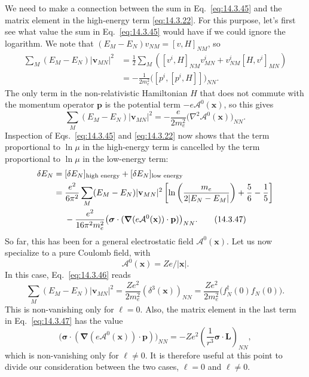 We need to make a connection between the sum in Eq.~\eqref{eq:14.3.45} and
the matrix element in the high-energy term \eqref{eq:14.3.22}. For this
purpose, let's first see what value the sum in Eq.~\eqref{eq:14.3.45} would
have if we could ignore the logarithm. We note that
$(E_M-E_N)v_{NM}=[v,H]_{NM}$, so
\begin{align*}
\sum_M(E_M-E_N)|\mathbf v_{MN}|^2
&=\frac12\sum_M\left([v^i,H]_{NM}v^i_{MN}
+v^i_{NM}[H,v^i]_{MN}\right)\\
&=-\frac{1}{2m_e^2}\bigl([p^i,[p^i,H]]\bigr)_{NN}.
\end{align*}
The only term in the non-relativistic Hamiltonian $H$ that does not commute
with the momentum operator $\mathbf p$ is the potential term
$-e\mathcal A^0(\mathbf x)$, so this gives
\begin{equation}
\sum_M(E_M-E_N)|\mathbf v_{MN}|^2
=-\frac{e}{2m_e^2}\bigl(\nabla^2\mathcal A^0(\mathbf x)\bigr)_{NN}.
\tag{14.3.46}\label{eq:14.3.46}
\end{equation}
Inspection of Eqs.~\eqref{eq:14.3.45} and \eqref{eq:14.3.22} now shows that
the term proportional to $\ln\mu$ in the high-energy term is cancelled by the
term proportional to $\ln\mu$ in the low-energy term:
\begin{align}
\delta E_N={}&[\delta E_N]_{\text{high energy}}
+[\delta E_N]_{\text{low energy}}\notag\\
={}&\frac{e^2}{6\pi^2}\sum_M(E_M-E_N)|\mathbf v_{MN}|^2
\left[\ln\left(\frac{m_e}{2|E_N-E_M|}\right)+\frac56-\frac15\right]
\notag\\
&-\frac{e^2}{16\pi^2m_e^2}
\bigl(\boldsymbol\sigma\cdot
(\boldsymbol\nabla(e\mathcal A^0(\mathbf x))\mathbin{\cdot}\mathbf p)
\bigr)_{NN}.
\tag{14.3.47}\label{eq:14.3.47}
\end{align}
So far, this has been for a general electrostatic field
$\mathcal A^0(\mathbf x)$. Let us now specialize to a pure Coulomb field,
with
\begin{equation}
\mathcal A^0(\mathbf x)=Ze/|\mathbf x|.
\tag{14.3.48}\label{eq:14.3.48}
\end{equation}
In this case, Eq.~\eqref{eq:14.3.46} reads
\begin{equation}
\sum_M(E_M-E_N)|\mathbf v_{MN}|^2
=\frac{Ze^2}{2m_e^2}(\delta^3(\mathbf x))_{NN}
=\frac{Ze^2}{2m_e^2}\bigl(f_N^\dagger(0)f_N(0)\bigr).
\tag{14.3.49}\label{eq:14.3.49}
\end{equation}
This is non-vanishing only for $\ell=0$. Also, the matrix element in the last
term in Eq.~\eqref{eq:14.3.47} has the value
\begin{equation}
\bigl(\boldsymbol\sigma\cdot
(\boldsymbol\nabla(e\mathcal A^0(\mathbf x))\mathbin{\cdot}\mathbf p)
\bigr)_{NN}
=-Ze^2\left(\frac{1}{r^3}\boldsymbol\sigma\cdot\mathbf L\right)_{NN},
\tag{14.3.50}\label{eq:14.3.50}
\end{equation}
which is non-vanishing only for $\ell\ne0$. It is therefore useful at this
point to divide our consideration between the two cases, $\ell=0$ and
$\ell\ne0$.


